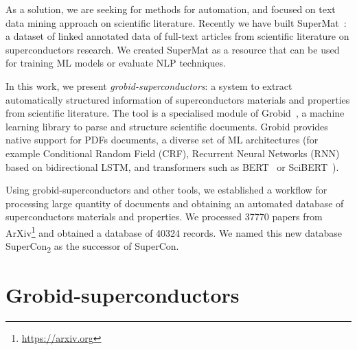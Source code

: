 \documentclass{article}
\begin{document}
As a solution, we are seeking for methods for automation, and focused on text data mining approach on scientific literature.
Recently we have built SuperMat~\cite{foppiano2021supermat}: a dataset of linked annotated data of full-text articles from scientific literature on superconductors research. We created SuperMat as a resource that can be used for training ML models or evaluate NLP techniques.

In this work, we present \textit{grobid-superconductors}: a system to extract automatically structured information of superconductors materials and properties from scientific literature. 
The tool is a specialised module of Grobid~\cite{GROBID}, a machine learning library to parse and structure scientific documents. 
Grobid provides native support for PDFs documents, a diverse set of ML architectures (for example Conditional Random Field (CRF), Recurrent Neural Networks (RNN) based on bidirectional LSTM, and transformers such as BERT~\cite{devlin2018bert} or SciBERT~\cite{Beltagy2019SciBERT}).

Using grobid-superconductors and other tools, we established a workflow for processing large quantity of documents and obtaining an automated database of superconductors materials and properties. 
We processed 37770 papers from ArXiv\footnote{\url{https://arxiv.org}} and obtained a database of 40324 records. We named this new database SuperCon\textsubscript{2} as the successor of SuperCon.


\section{Grobid-superconductors}
\end{document}
